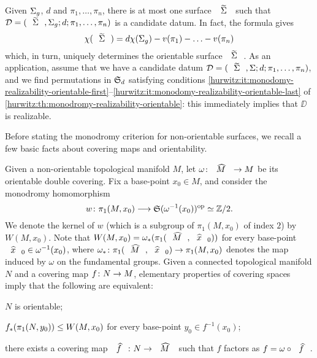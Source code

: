 \begin{remark}\label{hurwitz:rm:sigma-tilde-unique-orientable}
Given $\Sigma_{g}$, $d$ and $\pi_1,\ldots,\pi_n$, there is at most one surface $\tSigma$ such that $\DD=\datum{\tSigma,\surf{g}}{d}{\pi_1,\ldots,\pi_n}$ is a candidate datum. In fact, the \RH{} formula gives
\[
\chi(\tSigma)=d\chi(\surf{g})-v(\pi_1)-\ldots-v(\pi_n)
\]
which, in turn, uniquely determines the orientable surface $\tSigma$. As an application, assume that we have a candidate datum $\DD=\datum{\tSigma,\Sigma}{d}{\pi_1,\ldots,\pi_n}$, and we find permutations in $\symgroup[d]$ satisfying conditions \ref{hurwitz:it:monodomy-realizability-orientable-first}--\ref{hurwitz:it:monodomy-realizability-orientable-last} of \cref{hurwitz:th:monodromy-realizability-orientable}: this immediately implies that $\DD$ is realizable.
\end{remark}

Before stating the monodromy criterion for non-orientable surfaces, we recall a few basic facts about covering maps and orientability.

Given a non-orientable topological manifold $M$, let $\map{\omega}{\what{M}}{M}$ be its orientable double covering. Fix a base-point $x_0\in M$, and consider the monodromy homomorphism
\[
\map{w}{\pi_1(M,x_0)}{\op{\symgroup(\omega^{-1}(x_0))}\iso\ZZ/2}.
\]
We denote the kernel of $w$ (which is a subgroup of $\pi_1(M,x_0)$ of index $2$) by $W(M,x_0)$. Note that $W(M,x_0)=\omega_\ast(\pi_1(\what{M},\what{x}_0))$ for every base-point $\what{x}_0\in\omega^{-1}(x_0)$, where $\map{\omega_\ast}{\pi_1(\what{M},\what{x}_0)}{\pi_1(M,x_0)}$ denotes the map induced by $\omega$ on the fundamental groups. Given a connected topological manifold $N$ and a covering map $\map{f}{N}{M}$, elementary properties of covering spaces imply that the following are equivalent:
\begin{enumroman}
\item $N$ is orientable;
\item $f_\ast(\pi_1(N,y_0))\le W(M,x_0)$ for every base-point $y_0\in f^{-1}(x_0)$;
\item there exists a covering map $\map{\what{f}}{N}{\what{M}}$ such that $f$ factors as $f=\omega\circ\what{f}$.
\end{enumroman}

